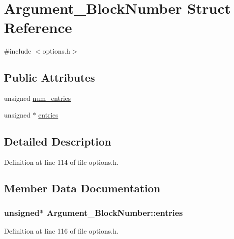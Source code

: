 \hypertarget{struct_argument___block_number}{}\section{Argument\+\_\+\+Block\+Number Struct Reference}
\label{struct_argument___block_number}


{\ttfamily \#include $<$options.\+h$>$}

\subsection*{Public Attributes}
\begin{DoxyCompactItemize}
\item 
unsigned \hyperlink{struct_argument___block_number_ade95a9211b282ffe7e4a5f78460dacc4}{num\+\_\+entries}
\item 
unsigned $\ast$ \hyperlink{struct_argument___block_number_a47949f69eb82c71a00035d4bd6172905}{entries}
\end{DoxyCompactItemize}


\subsection{Detailed Description}


Definition at line 114 of file options.\+h.



\subsection{Member Data Documentation}
\subsubsection[{\texorpdfstring{entries}{entries}}]{\setlength{\rightskip}{0pt plus 5cm}unsigned$\ast$ Argument\+\_\+\+Block\+Number\+::entries}\hypertarget{struct_argument___block_number_a47949f69eb82c71a00035d4bd6172905}{}\label{struct_argument___block_number_a47949f69eb82c71a00035d4bd6172905}


Definition at line 116 of file options.\+h.

